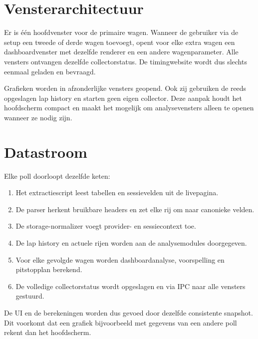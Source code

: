 \section{Vensterarchitectuur}
Er is één hoofdvenster voor de primaire wagen. Wanneer de gebruiker via de setup een tweede of derde
wagen toevoegt, opent voor elke extra wagen een dashboardvenster met dezelfde renderer en een andere
wagenparameter. Alle vensters ontvangen dezelfde collectorstatus. De timingwebsite wordt dus slechts
eenmaal geladen en bevraagd.

Grafieken worden in afzonderlijke vensters geopend. Ook zij gebruiken de reeds opgeslagen lap
history en starten geen eigen collector. Deze aanpak houdt het hoofdscherm compact en maakt het
mogelijk om analysevensters alleen te openen wanneer ze nodig zijn.

\section{Datastroom}
Elke poll doorloopt dezelfde keten:

\begin{enumerate}
  \item Het extractiescript leest tabellen en sessievelden uit de livepagina.
  \item De parser herkent bruikbare headers en zet elke rij om naar canonieke velden.
  \item De storage-normalizer voegt provider- en sessiecontext toe.
  \item De lap history en actuele rijen worden aan de analysemodules doorgegeven.
  \item Voor elke gevolgde wagen worden dashboardanalyse, voorspelling en pitstopplan berekend.
  \item De volledige collectorstatus wordt opgeslagen en via IPC naar alle vensters gestuurd.
\end{enumerate}

De UI en de berekeningen worden dus gevoed door dezelfde consistente snapshot. Dit voorkomt dat een
grafiek bijvoorbeeld met gegevens van een andere poll rekent dan het hoofdscherm.

